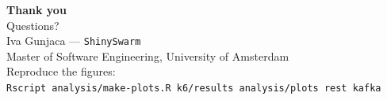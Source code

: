 \documentclass[aspectratio=169]{beamer}
\begin{document}
\begin{frame}{}
\begin{center}
{\Large\textbf{Thank you}}\\[1em]
{\large Questions?}\\[2em]
\small
Iva Gunjaca --- \texttt{ShinySwarm}\\
Master of Software Engineering, University of Amsterdam\\[0.5em]
\footnotesize
Reproduce the figures:\\
\texttt{Rscript analysis/make-plots.R k6/results analysis/plots rest kafka}
\end{center}
\end{frame}
\end{document}
